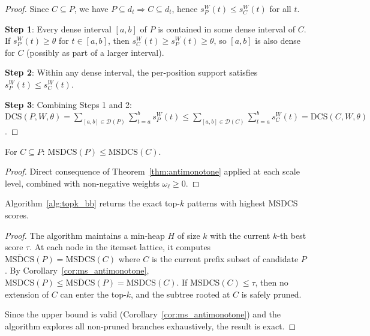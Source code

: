 \begin{proof}
Since $C \subseteq P$, we have $P \subseteq d_t \Rightarrow C \subseteq d_t$,
hence $s_P^W(t) \leq s_C^W(t)$ for all $t$.

\textbf{Step 1}: Every dense interval $[a,b]$ of $P$ is contained in
some dense interval of $C$. If $s_P^W(t) \geq \theta$ for $t \in [a,b]$,
then $s_C^W(t) \geq s_P^W(t) \geq \theta$, so $[a,b]$ is also dense for $C$
(possibly as part of a larger interval).

\textbf{Step 2}: Within any dense interval, the per-position support
satisfies $s_P^W(t) \leq s_C^W(t)$.

\textbf{Step 3}: Combining Steps 1 and 2:
$\mathrm{DCS}(P, W, \theta)
= \sum_{[a,b] \in \mathcal{D}(P)} \sum_{t=a}^{b} s_P^W(t)
\leq \sum_{[a,b] \in \mathcal{D}(C)} \sum_{t=a}^{b} s_C^W(t)
= \mathrm{DCS}(C, W, \theta)$.
\end{proof}

\begin{corollary}\label{cor:ms_antimonotone}
For $C \subseteq P$: $\mathrm{MSDCS}(P) \leq \mathrm{MSDCS}(C)$.
\end{corollary}

\begin{proof}
Direct consequence of Theorem~\ref{thm:antimonotone} applied at each scale level,
combined with non-negative weights $\omega_\ell \geq 0$.
\end{proof}

\begin{theorem}[B\&B Correctness]\label{thm:bb_correct}
Algorithm~\ref{alg:topk_bb} returns the exact top-$k$ patterns
with highest MSDCS scores.
\end{theorem}

\begin{proof}
The algorithm maintains a min-heap $H$ of size $k$ with the current
$k$-th best score $\tau$.
At each node in the itemset lattice, it computes
$\overline{\mathrm{MSDCS}}(P) = \mathrm{MSDCS}(C)$ where $C$ is the
current prefix subset of candidate $P$.
By Corollary~\ref{cor:ms_antimonotone},
$\mathrm{MSDCS}(P) \leq \overline{\mathrm{MSDCS}}(P) = \mathrm{MSDCS}(C)$.
If $\mathrm{MSDCS}(C) \leq \tau$, then no extension of $C$ can enter the top-$k$,
and the subtree rooted at $C$ is safely pruned.

Since the upper bound is valid (Corollary~\ref{cor:ms_antimonotone})
and the algorithm explores all non-pruned branches exhaustively,
the result is exact.
\end{proof}

